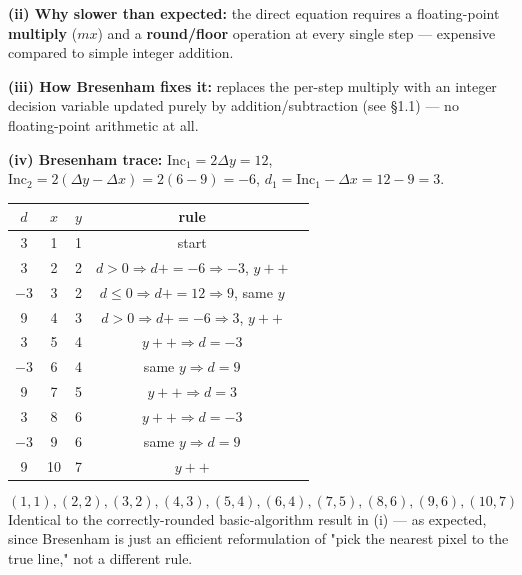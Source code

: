 \documentclass[12pt, a4paper]{article}
\newenvironment{solutionbox}{\begin{mdframed}[style=solutionframe]}{\end{mdframed}}
\newenvironment{answerbox}{\begin{mdframed}[style=answerframe]}{\end{mdframed}}
\begin{document}
\textbf{(ii) Why slower than expected:} the direct equation requires a floating-point \textbf{multiply} ($mx$) and a \textbf{round/floor} operation at every single step --- expensive compared to simple integer addition.

\textbf{(iii) How Bresenham fixes it:} replaces the per-step multiply with an integer decision variable updated purely by addition/subtraction (see \S1.1) --- no floating-point arithmetic at all.

\textbf{(iv) Bresenham trace:} $\mathrm{Inc}_1=2\Delta y=12$, $\mathrm{Inc}_2=2(\Delta y-\Delta x)=2(6-9)=-6$, $d_1=\mathrm{Inc}_1-\Delta x=12-9=3$.
\begin{solutionbox}
\begin{center}
\begin{tabular}{ccccl}
\toprule
$d$ & $x$ & $y$ & rule \\
\midrule
3  & 1 & 1 & start \\
3  & 2 & 2 & $d>0\Rightarrow d{+}{=}{-}6\Rightarrow{-}3$, $y{+}{+}$ \\
$-3$ & 3 & 2 & $d\le0\Rightarrow d{+}{=}12\Rightarrow9$, same $y$ \\
9  & 4 & 3 & $d>0\Rightarrow d{+}{=}{-}6\Rightarrow3$, $y{+}{+}$ \\
3  & 5 & 4 & $y{+}{+}\Rightarrow d{=}{-}3$ \\
$-3$ & 6 & 4 & same $y\Rightarrow d{=}9$ \\
9  & 7 & 5 & $y{+}{+}\Rightarrow d{=}3$ \\
3  & 8 & 6 & $y{+}{+}\Rightarrow d{=}{-}3$ \\
$-3$ & 9 & 6 & same $y\Rightarrow d{=}9$ \\
9  & 10 & 7 & $y{+}{+}$ \\
\bottomrule
\end{tabular}
\end{center}
\end{solutionbox}
\begin{answerbox}
$$(1,1),(2,2),(3,2),(4,3),(5,4),(6,4),(7,5),(8,6),(9,6),(10,7)$$
Identical to the correctly-rounded basic-algorithm result in (i) --- as expected, since Bresenham is just an efficient reformulation of "pick the nearest pixel to the true line," not a different rule.
\end{answerbox}
\end{document}
